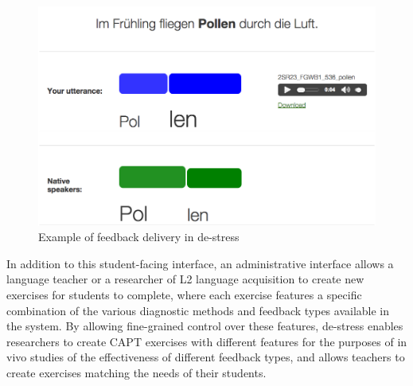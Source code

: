\documentclass[a4paper]{article}
\begin{document}
	\begin{figure}[htb]
		\centering
		\includegraphics[width=\columnwidth]{../../img/screenshots/graphicalFB-weka-plusTextStyle}
		\caption{Example of feedback delivery in de-stress}
		\label{fig:interface:student}
	\end{figure}

In addition to this student-facing interface, 
an administrative interface allows
a language teacher or a researcher of L2 language acquisition 
to
create new exercises for students to complete, where each exercise features a specific combination of the various diagnostic methods and feedback types available in the system. By allowing fine-grained control over these features, de-stress enables researchers to create CAPT exercises with different features for the purposes of in vivo studies of the effectiveness of different feedback types, and allows teachers to create exercises matching the needs of their students. 

\end{document}
